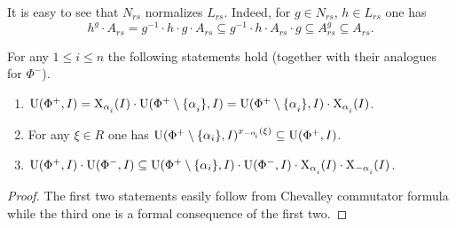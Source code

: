 It is easy to see that $N_{rs}$ normalizes $L_{rs}$. Indeed, for $g\in N_{rs}$, $h\in L_{rs}$ one has
$$h^g \cdot A_{rs} = g^{-1} \cdot h \cdot g \cdot A_{rs} \subseteq g^{-1} \cdot h \cdot A_{rs} \cdot g \subseteq A_{rs}^g \subseteq A_{rs}.$$

\begin{lemma}\label{lemma:dv_unipotent}
For any $1\leq i\leq n$ the following statements hold (together with their analogues for $\Phi^-$).
\begin{enumerate} 
\item $\U(\Phi^+, I) = \X_{\alpha\ssub{i}}(I)\cdot \U(\Phi^+\setminus\{\alpha\ssub{i}\}, I) = \U(\Phi^+\setminus\{\alpha\ssub{i}\}, I)\cdot \X_{\alpha\ssub{i}}(I)$.
\item For any $\xi\in R$ one has $\U(\Phi^+\setminus\{\alpha_i\}, I)^{x_{-\alpha\ssub{i}}(\xi)} \subseteq \U(\Phi^+, I)$.
\item $\U(\Phi^+, I)\cdot \U(\Phi^-, I) \subseteq \U(\Phi^+\setminus \{\alpha_i\}, I) \cdot \U(\Phi^-, I) \cdot \X_{\alpha\ssub{i}}(I) \cdot \X_{-\alpha\ssub{i}}(I)$.
\end{enumerate}
\end{lemma}
\begin{proof}
 The first two statements easily follow from Chevalley commutator formula while the third one is a formal consequence of the first two.
\end{proof}

